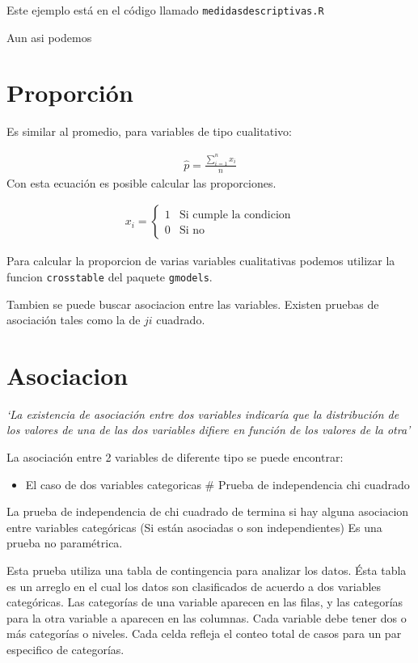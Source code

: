 \documentclass[twocolumn]{article}
\providecommand{\tightlist}{%
  \setlength{\itemsep}{0pt}\setlength{\parskip}{0pt}}
\begin{document}
Este ejemplo está en el código llamado \texttt{medidasdescriptivas.R}

Aun asi podemos

\section{Proporción}\label{proporciuxf3n}

Es similar al promedio, para variables de tipo cualitativo:

\[
\begin{array}{c}
  \hat{p} = \frac{\sum_{i=1}^n x_i}{n}
\end{array}
\] Con esta ecuación es posible calcular las proporciones.

\[
\begin{array}{c}
x_i =
   \begin{cases}
      1 & \text{Si cumple la condicion}\\
      0 & \text{Si no}
    \end{cases}
\end{array}
\]

Para calcular la proporcion de varias variables cualitativas podemos
utilizar la funcion \texttt{crosstable} del paquete \texttt{gmodels}.

Tambien se puede buscar asociacion entre las variables. Existen pruebas
de asociación tales como la de \(ji\) cuadrado.

\section{Asociacion}\label{asociacion}

\emph{`La existencia de asociación entre dos variables indicaría que la
distribución de los valores de una de las dos variables difiere en
función de los valores de la otra'}

La asociación entre 2 variables de diferente tipo se puede encontrar:

\begin{itemize}
\tightlist
\item
  El caso de dos variables categoricas \# Prueba de independencia chi
  cuadrado
\end{itemize}

La prueba de independencia de chi cuadrado de termina si hay alguna
asociacion entre variables categóricas (Si están asociadas o son
independientes) Es una prueba no paramétrica.

Esta prueba utiliza una tabla de contingencia para analizar los datos.
Ésta tabla es un arreglo en el cual los datos son clasificados de
acuerdo a dos variables categóricas. Las categorías de una variable
aparecen en las filas, y las categorías para la otra variable a aparecen
en las columnas. Cada variable debe tener dos o más categorías o
niveles. Cada celda refleja el conteo total de casos para un par
especifico de categorías.
\end{document}
